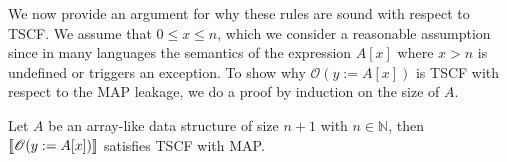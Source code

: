 We now provide an argument for why these rules are sound with respect to TSCF. We assume that $0\leq x \leq n$, which we consider a reasonable assumption since in many languages the semantics of the expression $A[x]$ where $x>n$ is undefined or triggers an exception. 
To show why $\mathscr{O}(y:=A[x])$ is TSCF with respect to the MAP leakage, we do a proof by induction on the size of $A$.
\begin{theorem}
    \label{theo:read}
    Let $A$ be an array-like data structure of size $n+1$ with $n\in \mathbb{N}$, then $\llbracket \mathscr{O}(y:=A[x])\rrbracket$ satisfies TSCF with MAP.
\end{theorem}
